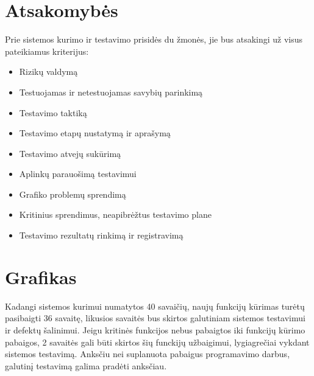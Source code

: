 \documentclass{VUMIFPSkursinis}
\begin{document}
    \section{Atsakomybės}

    Prie sistemos kurimo ir testavimo prisidės du žmonės, jie bus atsakingi už visus pateikiamus kriterijus: 

    \begin{itemize}
    	\item Rizikų valdymą
    	\item Testuojamas ir netestuojamas savybių parinkimą
    	\item Testavimo taktiką
    	\item Testavimo etapų nustatymą ir aprašymą
    	\item Testavimo atvejų sukūrimą
    	\item Aplinkų parauošimą testavimui
      \item Grafiko problemų sprendimą
    	\item Kritinius sprendimus, neapibrėžtus testavimo plane
    	\item Testavimo rezultatų rinkimą ir registravimą
    \end{itemize}

    \section{Grafikas}

    Kadangi sistemos kurimui numatytos 40 savaičių, naujų funkcijų kūrimas turėtų pasibaigti 36 savaitę,
     likusios savaitės bus skirtos galutiniam sistemos testavimui ir defektų šalinimui. 
    Jeigu kritinės funkcijos nebus pabaigtos iki funkcijų kūrimo pabaigos, 2 savaitės gali būti skirtos šių funckijų užbaigimui,
     lygiagrečiai vykdant sistemos testavimą.
    Anksčiu nei suplanuota pabaigus programavimo darbus, galutinį testavimą galima pradėti anksčiau.
    
\end{document}
